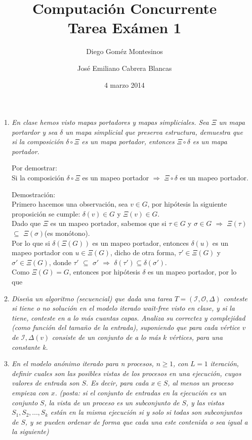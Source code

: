 \documentclass{article}
\title{Computación Concurrente \\ \Large{Tarea Exámen 1}}
\author{
  Diego Goméz Montesinos
  \and
  José Emiliano Cabrera Blancas
  }
\date{4 marzo 2014}
\begin{document}
\maketitle
\begin{enumerate}
  
\item{
    \textsl{
      En clase hemos visto mapas portadores y mapas simpliciales. Sea $\Xi$ un
      mapa portardor y sea $\delta$ un mapa simplicial que preserva estructura,
      demuestra que si la composición $\delta \circ \Xi$ es un mapa portador, 
      entonces $\Xi \circ \delta$ es un mapa portador.\\
    }
    
    Por demostrar:\\
    Si la composición $\delta \circ \Xi$ es un mapeo portador $\Rightarrow$ 
    $\Xi \circ \delta$ es un mapeo portador.
    
    Demostración:\\
    Primero hacemos una observación, sea $v \in G$, por hipótesis la siguiente 
    proposición se cumple: $\delta(v) \in G$ y $\Xi(v) \in G$.\\
    Dado que $\Xi$ es un mapeo portador, sabemos que si $\tau \in G$ y 
    $\sigma \in G$ $\Rightarrow$ $\Xi(\tau)$ $\subseteq$ $\Xi(\sigma)$(es monótono).\\
    Por lo que si $\delta(\Xi(G))$ es un mapeo portador, entonces $\delta(u)$ es un
    mapeo portador con $u \in \Xi(G)$, dicho de otra forma, $\tau' \in \Xi(G)$ y 
    $\sigma' \in \Xi(G)$, donde $\tau'$ $\subseteq$ $\sigma'$ $\Rightarrow$ $\delta(\tau') 
    \subseteq \delta(\sigma')$.\\
    Como $\Xi(G) = G$, entonces por hipótesis $\delta$ es un mapeo portador, por lo que 
    
  }
  
\item{
    \textsl{ 
      Diseña un algoritmo (secuencial) que dada una tarea $T = (\mathcal{I},\mathcal{O},\Delta)$
      conteste si tiene o no solución en el modelo iterado wait-free visto en clase, y si la tiene,
      conteste en a lo más cuantas capas. Analiza su correctez y complejidad (como función del tamaño
      de la entrada), suponiendo que para cada vértice $v$ de $\mathcal{I},\Delta(v)$ consiste de 
      un conjunto de a lo más $k$ vértices, para una constante k.
    }
  }    

\item {
    \textsl{
      En el modelo anónimo iterado para n procesos, $n ≥ 1$, con $L = 1$ iteración, definir
      cuales son las posibles vistas de los procesos en una ejecución, cuyos valores de entrada
      son $S$. Es decir, para cada $x \in S$, al menos un proceso empieza con $x$. (posta: si el
      conjunto de entradas en la ejecución es un conjunto $S$, la vista de un proceso es un 
      subconjunto de $S$, y las vistas $S_1,S_2,...,S_k$ están en la misma ejecución si y solo si
      todas son subconjuntos de $S$, y se pueden ordenar de forma que cada una este contenida o
      sea igual a la siguiente)
    }
  }
  

\end{enumerate}
\end{document}
